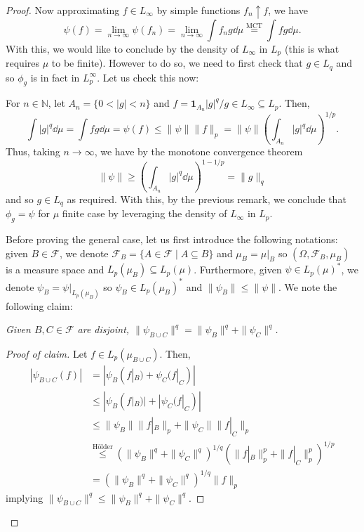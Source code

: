 \documentclass[]{article}
\theoremstyle{definition}
\begin{document}
\begin{proof}
  Now approximating \(f \in L_\infty\) by simple functions \(f_n \uparrow f\), we have 
  \[\psi(f) = \lim_{n \to \infty}\psi(f_n) 
    = \lim_{n \to \infty} \int f_n g \dd \mu \stackrel{\text{MCT}}{=} \int fg \dd \mu.\]
  With this, we would like to conclude by the density of \(L_\infty\) in \(L_p\) (this is what requires 
  \(\mu\) to be finite). However to do so, we need to first check that \(g \in L_q\) and so \(\phi_g\) 
  is in fact in \(L_p^\infty\). Let us check this now: 

  For \(n \in \mathbb{N}\), let \(A_n = \{0 < |g| < n\}\) and 
  \(f = \mathbf{1}_{A_n}|g|^q / g \in L_\infty \subseteq L_p\). 
  Then, \[\int |g|^q \dd \mu = \int fg \dd \mu = \psi(f) \le \|\psi\| \|f\|_p = 
    \|\psi\| \left(\int_{A_n} |g|^q \dd \mu\right)^{1 / p}.\] 
  Thus, taking \(n \to \infty\), we have by the monotone convergence theorem 
  \[\|\psi\| \ge \left(\int_{A_n} |g|^q \dd \mu\right)^{1 - 1 / p} = \|g\|_q\]
  and so \(g \in L_q\) as required. With this, by the previous remark, we conclude that \(\phi_g = \psi\) 
  for \(\mu\) finite case by leveraging the density of \(L_\infty\) in \(L_p\).

  Before proving the general case, let us first introduce the following notations: given \(B \in \mathcal{F}\),
  we denote \(\mathcal{F}_B = \{A \in \mathcal{F} \mid A \subseteq B\}\) and \(\mu_B = \mu|_B\) so 
  \((\Omega, \mathcal{F}_B, \mu_B)\) is a measure space and \(L_p(\mu_B) \subseteq L_p(\mu)\). 
  Furthermore, given \(\psi \in L_p(\mu)^*\), we denote \(\psi_B = \psi|_{L_p(\mu_B)}\) so 
  \(\psi_B \in L_p(\mu_B)^*\) and \(\|\psi_B\| \le \|\psi\|\). We note the following claim:

  \textit{Given \(B, C \in \mathcal{F}\) are disjoint, \(\|\psi_{B \cup C}\|^q = \|\psi_B\|^q + \|\psi_C\|^q\).}
  \begin{proof}[Proof of claim]
    Let \(f \in L_p(\mu_{B \cup C})\). Then,
    \begin{align*}
      |\psi_{B \cup C}(f)| & = |\psi_B(f|_B) + \psi_C(f|_C)|\\
      & \le |\psi_B(f|_B)| + |\psi_C(f|_C)|\\
      & \le \|\psi_B\|\|f|_B\|_p + \|\psi_C\|\|f|_C\|_p\\
      & \stackrel{\text{Hölder}}{\le} (\|\psi_B\|^q + \|\psi_C\|^q)^{1 / q}(\|f|_B\|_p^p + \|f|_C\|_p^p)^{1 / p}\\
      & = (\|\psi_B\|^q + \|\psi_C\|^q)^{1 / q}\|f\|_p
    \end{align*}
    implying \(\|\psi_{B \cup C}\|^q \le \|\psi_B\|^q + \|\psi_C\|^q\).


\end{proof}
\end{proof}
\end{document}

